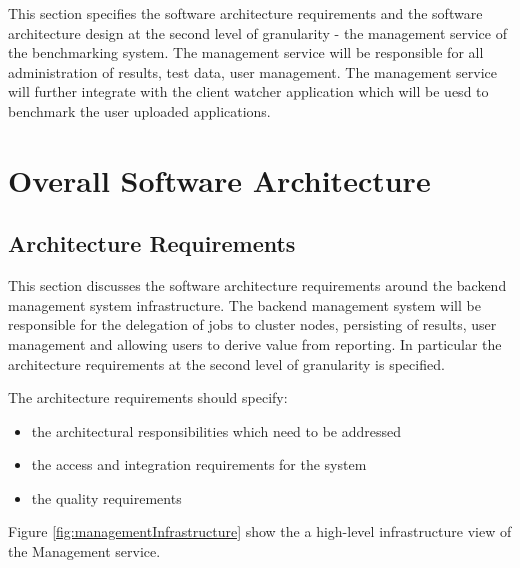 This section specifies the software architecture requirements and the software
architecture design at the second level of granularity - the management service
of the benchmarking system. The management service will be responsible for all
administration of results, test data, user management. The management service
will further integrate with the client watcher application which will be uesd to
benchmark the user uploaded applications.

\section{Overall Software Architecture}
\subsection{Architecture Requirements}
This section discusses the software architecture requirements around the
backend management system infrastructure. The backend management system will be
responsible for the delegation of jobs to cluster nodes, persisting of results,
user management and allowing users to derive value from reporting. In particular
the architecture requirements at the second level of granularity is specified.

The architecture requirements should specify:
\begin{itemize}
	\item the architectural responsibilities which need to be addressed
	\item the access and integration requirements for the system
	\item the quality requirements
\end{itemize}

Figure \ref{fig:managementInfrastructure} show the a high-level infrastructure
view of the Management service.

